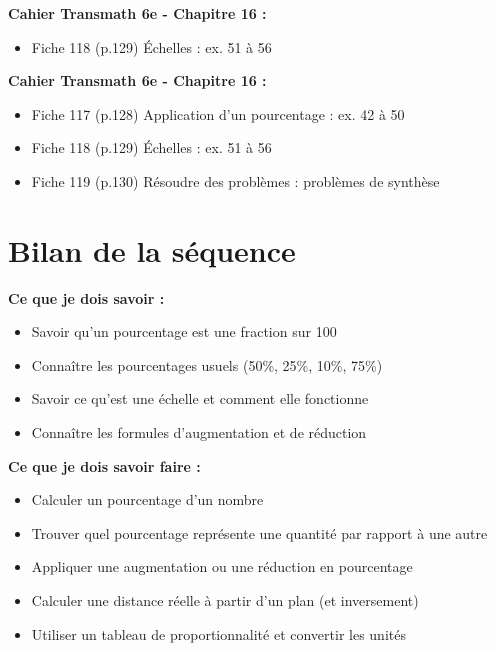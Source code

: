 \begin{remarkbox}
	\textbf{Cahier Transmath 6e - Chapitre 16 :}
	\begin{itemize}
		\item Fiche 118 (p.129) \og \'Echelles\fg{} : ex. 51 \`a 56
	\end{itemize}
\end{remarkbox}

\seance

\begin{remarkbox}
	\textbf{Cahier Transmath 6e - Chapitre 16 :}
	\begin{itemize}
		\item Fiche 117 (p.128) \og Application d'un pourcentage\fg{} : ex. 42 \`a 50
		\item Fiche 118 (p.129) \og \'Echelles\fg{} : ex. 51 \`a 56
		\item Fiche 119 (p.130) \og R\'esoudre des probl\`emes\fg{} : probl\`emes de synth\`ese
	\end{itemize}
\end{remarkbox}

\section{Bilan de la séquence}

\begin{bilanbox}
	\textbf{Ce que je dois savoir :}
	\begin{itemize}
		\item[$\checkmark$] Savoir qu'un pourcentage est une fraction sur 100
		\item[$\checkmark$] Connaître les pourcentages usuels (50\%, 25\%, 10\%, 75\%)
		\item[$\checkmark$] Savoir ce qu'est une échelle et comment elle fonctionne
		\item[$\checkmark$] Connaître les formules d'augmentation et de réduction
	\end{itemize}

	\textbf{Ce que je dois savoir faire :}
	\begin{itemize}
		\item[$\checkmark$] Calculer un pourcentage d'un nombre
		\item[$\checkmark$] Trouver quel pourcentage représente une quantité par rapport à une autre
		\item[$\checkmark$] Appliquer une augmentation ou une réduction en pourcentage
		\item[$\checkmark$] Calculer une distance réelle à partir d'un plan (et inversement)
		\item[$\checkmark$] Utiliser un tableau de proportionnalité et convertir les unités
	\end{itemize}
\end{bilanbox}

